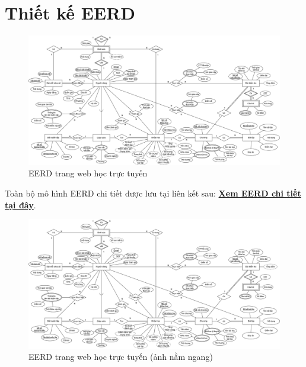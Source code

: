 \section{Thiết kế EERD}
\begin{figure}[H]
    \centering
    \includegraphics[width=1\linewidth]{picture/ERD.drawio.png}
    \caption{EERD trang web học trực tuyến}
    \label{fig:placeholder}
\end{figure}
Toàn bộ mô hình EERD chi tiết được lưu tại liên kết sau:
\href{https://app.diagrams.net/#G1XY2dIsVTmTCCmIWk3s_vGwzFGodUWAKx#%7B%22pageId%22%3A%22BJtFvQvSTNEqXKE1NMD3%22%7D}{\textbf{Xem EERD chi tiết tại đây}}.
\newpage
\begin{figure}[H]
    \centering
    \includegraphics[angle=-90, width=0.7\linewidth]{picture/ERD.drawio.png}
    \caption{EERD trang web học trực tuyến (ảnh nằm ngang)}
    \label{fig:placeholder}
\end{figure}